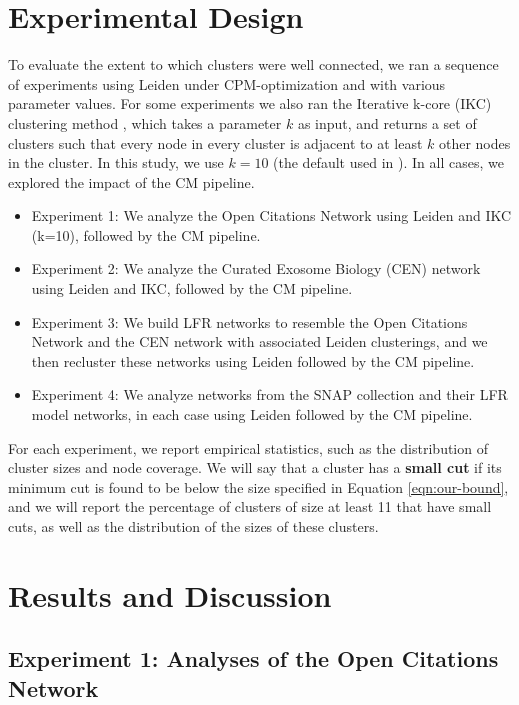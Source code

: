 \documentclass[11pt]{article}   	%
\begin{document}
\section{Experimental Design}
\label{sec:expt-design}
To evaluate the extent to which clusters were well connected, we ran a sequence of experiments using Leiden under CPM-optimization and with various parameter values. For some experiments we also ran the Iterative k-core (IKC) clustering method \citep{Wedell2022}, which takes a parameter $k$ as input, and returns a set of clusters such that every node in every cluster is adjacent to at least $k$ other nodes in the cluster. In this study, we use $k=10$ (the default used in \cite{Wedell2022}).
In all cases, we explored the impact of the CM pipeline.
\begin{itemize}
\item Experiment 1: We analyze the Open Citations Network using Leiden  and IKC (k=10), followed by the CM pipeline.
\item Experiment 2: We analyze the Curated Exosome Biology (CEN) network using Leiden and IKC, followed by the CM pipeline.
\item Experiment 3: We build LFR networks to resemble the Open Citations Network and the CEN network with associated  Leiden clusterings, and we then recluster these networks using Leiden followed by the CM pipeline.
\item Experiment 4: We analyze networks from the SNAP collection and their LFR model networks, in each case using Leiden followed by the CM pipeline.
\end{itemize}

For each experiment, we report empirical statistics, such as the distribution of cluster sizes and node  coverage.
We will say that a cluster has a {\bf small cut} if its minimum cut is found to be below  the size specified in
 Equation \ref{eqn:our-bound}, and we will report the percentage of clusters of size at least 11 that have small cuts, as well as the distribution of the sizes
 of these clusters.



\section{Results and Discussion}
\label{sec:results-discussion}

\subsection{Experiment 1: Analyses of the Open Citations Network}
\end{document}
